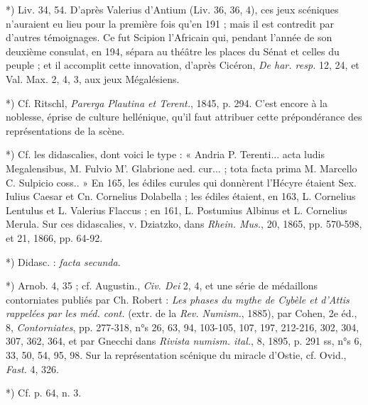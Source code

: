 \documentclass[a4paper, 11pt, oneside, polutonikogreek, french]{article}
\begin{document}
*) Liv. 34, 54. D'après Valerius d'Antium (Liv. 36, 36, 4), ces jeux scéniques n'auraient eu lieu pour la première fois qu'en 191 ; mais il est contredit par d'autres témoignages. Ce fut Scipion l'Africain qui, pendant l'année de son deuxième consulat, en 194, sépara au théâtre les places du Sénat et celles du peuple ; et il accomplit cette innovation, d'après Cicéron, \emph{De har. resp.} 12, 24, et Val. Max. 2, 4, 3, aux jeux Mégalésiens.

*) Cf. Ritschl, \emph{Parerga Plautina et Terent.}, 1845, p. 294. C'est encore à la noblesse, éprise de culture hellénique, qu'il faut attribuer cette prépondérance des représentations de la scène.

*) Cf. les didascalies, dont voici le type : « Andria P. Terenti... acta ludis Megalensibus, M. Fulvio M'. Glabrione aed. cur... ; tota facta prima M. Marcello C. Sulpicio coss.. » En 165, les édiles curules qui donnèrent l'Hécyre étaient Sex. Iulius Caesar et Cn. Cornelius Dolabella ; les édiles étaient, en 163, L. Cornelius Lentulus et L. Valerius Flaccus ; en 161, L. Postumius Albinus et L. Cornelius Merula. Sur ces didascalies, v. Dziatzko, dans \emph{Rhein. Mus.}, 20, 1865, pp. 570-598, et 21, 1866, pp. 64-92.

*) Didasc. : \emph{facta secunda}.

*) Arnob. 4, 35 ; cf. Augustin., \emph{Civ. Dei} 2, 4, et une série de médaillons contorniates publiés par Ch. Robert : \emph{Les phases du mythe de Cybèle et d'Attis rappelées par les méd. cont.} (extr. de la \emph{Rev. Numism.}, 1885), par Cohen, 2e éd., 8, \emph{Contorniates}, pp. 277-318, n°s 26, 63, 94, 103-105, 107, 197, 212-216, 302, 304, 307, 362, 364, et par Gnecchi dans \emph{Rivista numism. ital.}, 8, 1895, p. 291 ss, n°s 6, 33, 50, 54, 95, 98. Sur la représentation scénique du miracle d'Ostie, cf. Ovid., \emph{Fast.} 4, 326.

*) Cf. p. 64, n. 3.
\end{document}
